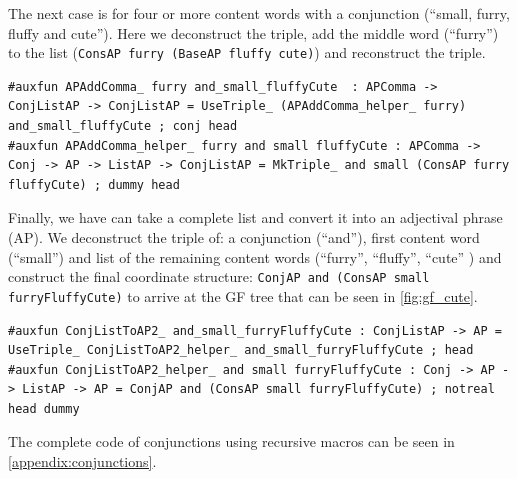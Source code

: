 The next case is for four or more content words with a conjunction (``small, furry, fluffy and cute''). Here we deconstruct the triple, add the middle word (``furry'') to the list (\verb|ConsAP furry (BaseAP fluffy cute)|) and reconstruct the triple.
\begin{lstlisting}
#auxfun APAddComma_ furry and_small_fluffyCute  : APComma -> ConjListAP -> ConjListAP = UseTriple_ (APAddComma_helper_ furry) and_small_fluffyCute ; conj head
#auxfun APAddComma_helper_ furry and small fluffyCute : APComma -> Conj -> AP -> ListAP -> ConjListAP = MkTriple_ and small (ConsAP furry fluffyCute) ; dummy head
\end{lstlisting}

Finally, we have can take a complete list and convert it into an adjectival phrase (AP). We deconstruct the triple of: a conjunction (``and''), first content word (``small'') and list of the remaining content words (``furry'', ``fluffy'', ``cute''
) and construct the final coordinate structure: \verb|ConjAP and (ConsAP small furryFluffyCute)| to arrive at the GF tree that can be seen in \autoref{fig:gf_cute}.
\begin{lstlisting}
#auxfun ConjListToAP2_ and_small_furryFluffyCute : ConjListAP -> AP = UseTriple_ ConjListToAP2_helper_ and_small_furryFluffyCute ; head
#auxfun ConjListToAP2_helper_ and small furryFluffyCute : Conj -> AP -> ListAP -> AP = ConjAP and (ConsAP small furryFluffyCute) ; notreal head dummy
\end{lstlisting}

The complete code of conjunctions using recursive macros can be seen in \autoref{appendix:conjunctions}.

%
%



